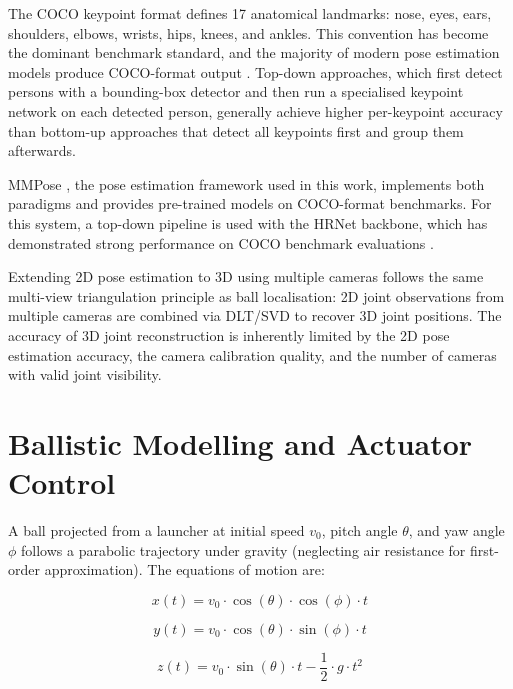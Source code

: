 The COCO keypoint format defines 17 anatomical landmarks: nose, eyes, ears, shoulders, elbows, wrists, hips, knees, and ankles. This convention has become the dominant benchmark standard, and the majority of modern pose estimation models produce COCO-format output \cite{ref16}. Top-down approaches, which first detect persons with a bounding-box detector and then run a specialised keypoint network on each detected person, generally achieve higher per-keypoint accuracy than bottom-up approaches that detect all keypoints first and group them afterwards.

MMPose \cite{ref17}, the pose estimation framework used in this work, implements both paradigms and provides pre-trained models on COCO-format benchmarks. For this system, a top-down pipeline is used with the HRNet backbone, which has demonstrated strong performance on COCO benchmark evaluations \cite{ref18}.

Extending 2D pose estimation to 3D using multiple cameras follows the same multi-view triangulation principle as ball localisation: 2D joint observations from multiple cameras are combined via DLT/SVD to recover 3D joint positions. The accuracy of 3D joint reconstruction is inherently limited by the 2D pose estimation accuracy, the camera calibration quality, and the number of cameras with valid joint visibility.

\section{Ballistic Modelling and Actuator Control}

A ball projected from a launcher at initial speed $v_0$, pitch angle $\theta$, and yaw angle $\phi$ follows a parabolic trajectory under gravity (neglecting air resistance for first-order approximation). The equations of motion are:

\begin{equation}
x(t) = v_0 \cdot \cos(\theta) \cdot \cos(\phi) \cdot t \label{eq:2_2}
\end{equation}

\begin{equation}
y(t) = v_0 \cdot \cos(\theta) \cdot \sin(\phi) \cdot t \label{eq:2_3}
\end{equation}

\begin{equation}
z(t) = v_0 \cdot \sin(\theta) \cdot t - \frac{1}{2} \cdot g \cdot t^2 \label{eq:2_4}
\end{equation}

